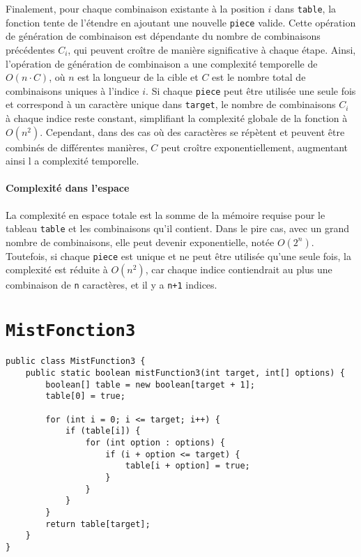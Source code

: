 \documentclass[9pt]{report}
\begin{document}
\begin{multicols*}{2}
  Finalement, pour chaque combinaison existante à la position $i$ dans \texttt{table}, 
  la fonction tente de l'étendre en ajoutant une nouvelle \texttt{piece} valide. 
  Cette opération de génération de combinaison est dépendante du nombre de
  combinaisons précédentes $C_i$, qui peuvent croître de manière significative 
  à chaque étape. Ainsi, l'opération de génération de combinaison a une 
  complexité temporelle de $O(n \cdot C)$, où $n$ est la longueur de la 
  cible et $C$ est le nombre total de combinaisons uniques à l'indice $i$. 
  Si chaque \texttt{piece} peut être utilisée une seule fois et correspond 
  à un caractère unique dans \texttt{target}, le nombre de combinaisons $C_i$ 
  à chaque indice reste constant, simplifiant la complexité globale de la fonction à $O(n^2)$.
  Cependant, dans des cas où des caractères se répètent et peuvent être combinés de
  différentes manières, $C$ peut croître exponentiellement, augmentant ainsi l
  a complexité temporelle.


  \paragraph{Complexité dans l'espace}
  La complexité en espace totale est la somme de la mémoire requise pour le tableau 
  \texttt{table} et les combinaisons qu'il contient. Dans le pire cas, avec un grand nombre de 
  combinaisons, elle peut devenir exponentielle, notée \( O(2^n) \). Toutefois, si chaque 
  \texttt{piece} est unique et ne peut être utilisée qu'une seule fois, la complexité est 
  réduite à \( O(n^2) \), car chaque indice contiendrait au plus une combinaison de \texttt{n} 
  caractères, et il y a \texttt{n+1} indices.

  \section{\texttt{MistFonction3}}
  \begin{lstlisting}[style=JavaDraculaWhite]
 public class MistFunction3 {
    public static boolean mistFunction3(int target, int[] options) {
        boolean[] table = new boolean[target + 1];
        table[0] = true;

        for (int i = 0; i <= target; i++) {
            if (table[i]) {
                for (int option : options) {
                    if (i + option <= target) {
                        table[i + option] = true;
                    }
                }
            }
        }
        return table[target];
    }
}    
  \end{lstlisting}



\end{multicols*}
\end{document}
